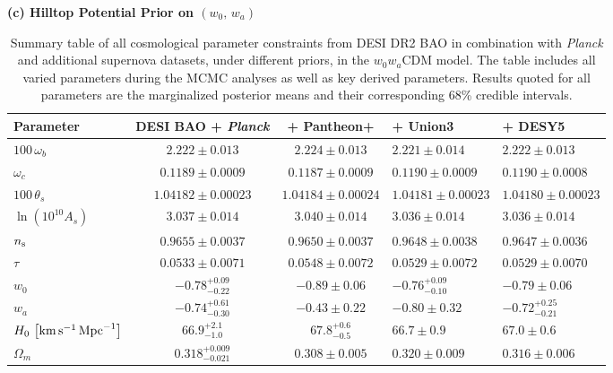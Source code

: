 \begin{subappendices}
\begin{table}[hb!]
	\textbf{(c) Hilltop Potential Prior on $(w_0,\,w_a)$}\\[4pt]
		\begingroup
		\renewcommand{\arraystretch}{1.05}
		\begin{tabularx}{\textwidth}{@{}>{\raggedright\arraybackslash}p{3.2cm} c c W W @{}}
			\toprule
			Parameter & DESI BAO + {\it Planck} & + Pantheon+ & + Union3 & + DESY5 \\
			\midrule[0.065em]
			$100\,\omega_b$ & $2.222 \pm 0.013$ & $2.224 \pm 0.013$ & $2.221 \pm 0.014$ & $2.222 \pm 0.013$ \\
			$\omega_c$ & $0.1189 \pm 0.0009$ & $0.1187 \pm 0.0009$ & $0.1190 \pm 0.0009$ & $0.1190 \pm 0.0008$ \\
			$100\,\theta_s$ & $1.04182 \pm 0.00023$ & $1.04184 \pm 0.00024$ & $1.04181 \pm 0.00023$ & $1.04180 \pm 0.00023$ \\
			$\ln\left(10^{10}A_s\right)$ & $3.037 \pm 0.014$ & $3.040 \pm 0.014$ & $3.036 \pm 0.014$ & $3.036 \pm 0.014$ \\
			$n_{\rm s}$ & $0.9655 \pm 0.0037$ & $0.9650 \pm 0.0037$ & $0.9648 \pm 0.0038$ & $0.9647 \pm 0.0036$ \\
			$\tau$ & $0.0533 \pm 0.0071$ & $0.0548 \pm 0.0072$ & $0.0529 \pm 0.0072$ & $0.0529 \pm 0.0070$ \\
			$w_0$ & $-0.78^{+0.09}_{-0.22}$ & $-0.89\pm 0.06$ & $-0.76^{+0.09}_{-0.10}$ & $-0.79\pm 0.06$ \\
			$w_a$ & $-0.74^{+0.61}_{-0.30}$ & $-0.43\pm 0.22$ & $-0.80\pm 0.32$ & $-0.72^{+0.25}_{-0.21}$ \\
			$H_0\,\left[{\rm km}\,{\rm s}^{-1}\,{\rm Mpc}^{-1}\right]$ & $66.9^{+2.1}_{-1.0}$ & $67.8^{+0.6}_{-0.5}$ & $66.7\pm 0.9$ & $67.0\pm 0.6$ \\
			$\Omega_m$ & $0.318^{+0.009}_{-0.021}$ & $0.308\pm 0.005$ & $0.320\pm 0.009$ & $0.316\pm 0.006$ \\
			\bottomrule
		\end{tabularx}
		\endgroup

	\caption[Complete cosmological parameter constraints under all prior choices]{Summary table of all cosmological parameter constraints from DESI DR2 BAO in combination with {\it Planck} and additional supernova datasets, under different priors, in the $w_0 w_a$CDM model. The table includes all varied parameters during the MCMC analyses as well as key derived parameters. Results quoted for all parameters are the marginalized posterior means and their corresponding 68\% credible intervals.}
	\label{tab:ch11-analysis_all}
\end{table}

\end{subappendices}
